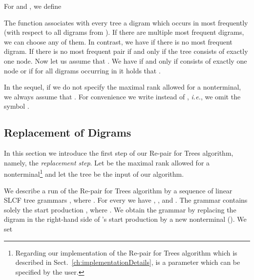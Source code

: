 \documentclass[12pt]{llncs}
\newcommand{\tp}{digram\xspace}
\newcommand{\tps}{digrams\xspace}
\newcommand{\ltps}{Digrams\xspace}
\newcommand{\hairsp}{\hspace{1pt}}\newcommand{\TODO}{\textcolor{red}{\bf TODO!}\xspace}
\newcommand{\ie}{\mbox{\textit{i.\hairsp{}e.}}\xspace}
\begin{document}
\begin{figure}[tb]
\begin{center}
{{
		\endpgfgraphicnamed
		}
		\label{fig:replacementProcessAfter}
	}
	\end{center}
\end{figure}
For  and , we define

The function  associates with every tree  a \tp  which occurs in  most frequently (with respect to all \tps from ). If there are multiple most frequent \tps, we can choose any of them. In contrast, we have  if there is no most frequent \tp. If  there is no most frequent pair if and only if the tree  consists of exactly one node. Now let us assume that . We have  if and only if  consists of exactly one node or if for all \tps  occurring in  it holds that . 

In the sequel, if we do not specify the maximal rank allowed for a nonterminal, we always assume that . For convenience we write  instead of , \ie, we omit the symbol .

\subsection{Replacement of \ltps}\label{sec:replacementStep}

In this section we introduce the first step of our Re-pair for Trees algorithm, namely, the \emph{replacement step}. Let  be the maximal rank allowed for a nonterminal\footnote{Regarding our implementation of the Re-pair for Trees algorithm which is described in Sect.~\ref{ch:implementationDetails},  is a parameter which can be specified by the user.} and let the tree  be the input of our algorithm.

We describe a run of the Re-pair for Trees algorithm by a sequence of  linear SLCF tree grammars
, where . For every  we have , ,  and . 
The grammar  contains solely the start production , where . We obtain the grammar  by replacing the \tp  in the right-hand side of 's start production  by a new nonterminal  (). We set
\end{document}
